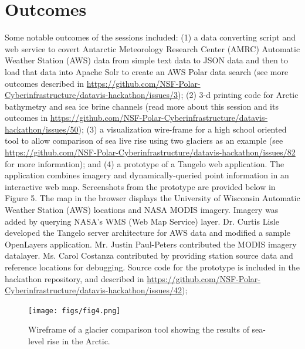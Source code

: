 \documentclass[11pt]{article}
\begin{document}
\section{Outcomes}
Some notable outcomes of the sessions included: (1) a data converting script and web service to covert Antarctic Meteorology Research Center (AMRC) Automatic Weather Station (AWS) data from simple text data to JSON data and then to load that data into Apache Solr to create an AWS Polar data search (see more outcomes described in \url{https://github.com/NSF-Polar-Cyberinfrastructure/datavis-hackathon/issues/3}); (2) 3-d printing code for Arctic bathymetry and sea ice brine channels (read more about this session and its outcomes in \url{https://github.com/NSF-Polar-Cyberinfrastructure/datavis-hackathon/issues/50}); (3) a visualization wire-frame for a high school oriented tool to allow comparison of sea live rise using two glaciers as an example (see \url{https://github.com/NSF-Polar-Cyberinfrastructure/datavis-hackathon/issues/82} for more information); and (4) a prototype of a Tangelo web application.  The application combines imagery and dynamically-queried point information in an interactive web map.  Screenshots from the prototype are provided below in Figure 5.  The map in the browser displays the University of Wisconsin Automatic Weather Station (AWS) locations and NASA MODIS imagery. Imagery was added by querying NASA's WMS (Web Map Service) layer.  Dr. Curtis Lisle developed the Tangelo server architecture for AWS data and modified a sample OpenLayers application.  Mr. Justin Paul-Peters contributed the MODIS imagery datalayer.  Ms. Carol Costanza contributed by providing station source data and reference locations for debugging. Source code for the prototype is included in the hackathon repository, and described in  \url{https://github.com/NSF-Polar-Cyberinfrastructure/datavis-hackathon/issues/42}); 

\begin{figure}[htp]
    \centering
    \texttt{[image: figs/fig4.png]}
    \caption{Wireframe of a glacier comparison tool showing the results of sea-level rise in the Arctic.}
    \label{fig:website}
\end{figure}
\end{document}
